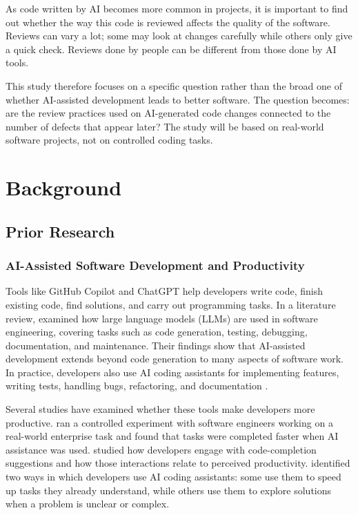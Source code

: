 \documentclass[stu,12pt,donotrepeattitle]{apa7}
\begin{document}
As code written by AI becomes more common in projects, it is important to find out whether the way this code is reviewed affects the quality of the software. Reviews can vary a lot; some may look at changes carefully while others only give a quick check. Reviews done by people can be different from those done by AI tools.

This study therefore focuses on a specific question rather than the broad one of whether AI-assisted development leads to better software. The question becomes: are the review practices used on AI-generated code changes connected to the number of defects that appear later? The study will be based on real-world software projects, not on controlled coding tasks.

\section{Background}

\subsection{Prior Research}

\subsubsection{AI-Assisted Software Development and Productivity}

Tools like GitHub Copilot and ChatGPT help developers write code, finish existing code, find solutions, and carry out programming tasks. In a literature review, \textcite{hou2024} examined how large language models (LLMs) are used in software engineering, covering tasks such as code generation, testing, debugging, documentation, and maintenance. Their findings show that AI-assisted development extends beyond code generation to many aspects of software work. In practice, developers also use AI coding assistants for implementing features, writing tests, handling bugs, refactoring, and documentation \parencite{vaithilingam2025}.

Several studies have examined whether these tools make developers more productive. \textcite{paradis2025} ran a controlled experiment with software engineers working on a real-world enterprise task and found that tasks were completed faster when AI assistance was used. \textcite{ziegler2022} studied how developers engage with code-completion suggestions and how those interactions relate to perceived productivity. \textcite{barke2023} identified two ways in which developers use AI coding assistants: some use them to speed up tasks they already understand, while others use them to explore solutions when a problem is unclear or complex.
\end{document}
